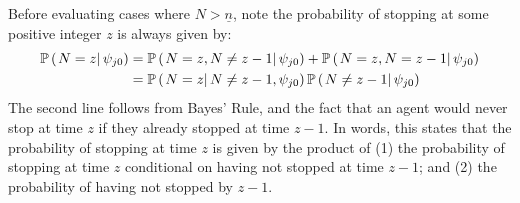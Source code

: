 Before evaluating cases where $N > \underline{n}$, note the probability of stopping at some positive integer $z$ is always given by:
\begin{align*}
    \mathbb{P} \left( \left. N = z \right\vert \psi_{j0} \right) 
    &=
    \mathbb{P} \left( \left. N = z, N \neq z - 1 \right\vert \psi_{j0} \right)
    +
    \mathbb{P} \left( \left. N = z, N = z - 1 \right\vert \psi_{j0} \right)
    \\
    &=
    \mathbb{P} \left( \left. N = z \right\vert N \neq z - 1, \psi_{j0} \right)
    \mathbb{P} \left( \left. N \neq z - 1 \right\vert \psi_{j0} \right)
\end{align*}
The second line follows from Bayes' Rule, and the fact that an agent would never stop at time $z$ if they already stopped at time $z-1$.
In words, this states that the probability of stopping at time $z$ is given by the product of (1) the probability of stopping at time $z$ conditional on having not stopped at time $z-1$; and (2) the probability of having not stopped by $z-1$.

